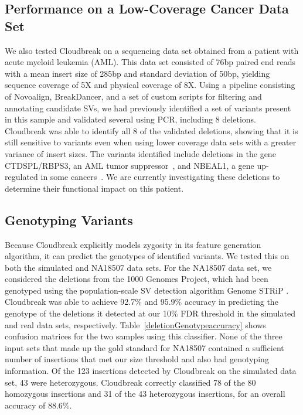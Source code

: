 \subsection{Performance on a Low-Coverage Cancer Data Set}

We also tested Cloudbreak on a sequencing data set obtained from a patient with acute myeloid leukemia (AML). This data set consisted of 76bp paired end reads with a mean insert size of 285bp and standard deviation of 50bp, yielding sequence coverage of 5X and physical coverage of 8X. Using a pipeline consisting of Novoalign, BreakDancer, and a set of custom scripts for filtering and annotating candidate SVs, we had previously identified a set of variants present in this sample and validated several using PCR, including 8 deletions. Cloudbreak was able to identify all 8 of the validated deletions, showing that it is still sensitive to variants even when using lower coverage data sets with a greater variance of insert sizes. The variants identified include deletions in the gene CTDSPL/RBPS3, an AML tumor suppressor~\cite{Zheng:2012kk}, and NBEAL1, a gene up-regulated in some cancers~\cite{Chen:2004jo}. We are currently investigating these deletions to determine their functional impact on this patient. 

\subsection{Genotyping Variants}

Because Cloudbreak explicitly models zygosity in its feature generation algorithm, it can predict the genotypes of identified variants. We tested this on both the simulated and NA18507 data sets. For the NA18507 data set, we considered the deletions from the 1000 Genomes Project, which had been genotyped using the population-scale SV detection algorithm Genome STRiP \cite{Handsaker:2011ki}. Cloudbreak was able to achieve 92.7\% and 95.9\% accuracy in predicting the genotype of the deletions it detected at our 10\% FDR threshold in the simulated and real data sets, respectively. Table~\ref{deletionGenotypeaccuracy} shows confusion matrices for the two samples using this classifier. None of the three input sets that made up the gold standard for NA18507 contained a sufficient number of insertions that met our size threshold and also had genotyping information. Of the 123 insertions detected by Cloudbreak on the simulated data set, 43 were heterozygous. Cloudbreak correctly classified 78 of the 80 homozygous insertions and 31 of the 43 heterozygous insertions, for an overall accuracy of 88.6\%.

